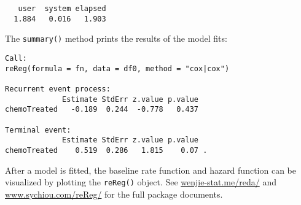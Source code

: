 \begin{Shaded}
\begin{Highlighting}[]
\StringTok{ } \NormalTok{))}
\end{Highlighting}
\end{Shaded}

\begin{verbatim}
   user  system elapsed 
  1.884   0.016   1.903 
\end{verbatim}

The \texttt{summary()} method prints the results of the model fits:

\begin{Shaded}
\begin{Highlighting}[]
\end{Highlighting}
\end{Shaded}

\begin{verbatim}
Call: 
reReg(formula = fn, data = df0, method = "cox|cox")

Recurrent event process:
             Estimate StdErr z.value p.value
chemoTreated   -0.189  0.244  -0.778   0.437

Terminal event:
             Estimate StdErr z.value p.value  
chemoTreated    0.519  0.286   1.815    0.07 .
\end{verbatim}

After a model is fitted, the baseline rate function and hazard function
can be visualized by plotting the \texttt{reReg()} object. See
\url{wenjie-stat.me/reda/} and \url{www.sychiou.com/reReg/} for the full
package documents.
